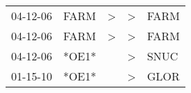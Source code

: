 \begin{supertabular}{lllll}
 04-12-06 &   FARM &  \textgreater &  \textgreater &  FARM \\
 04-12-06 &   FARM &  \textgreater &  \textgreater &  FARM \\
 04-12-06 &  *OE1* &               &  \textgreater &  SNUC \\
 01-15-10 &  *OE1* &               &  \textgreater &  GLOR \\
\end{supertabular}
